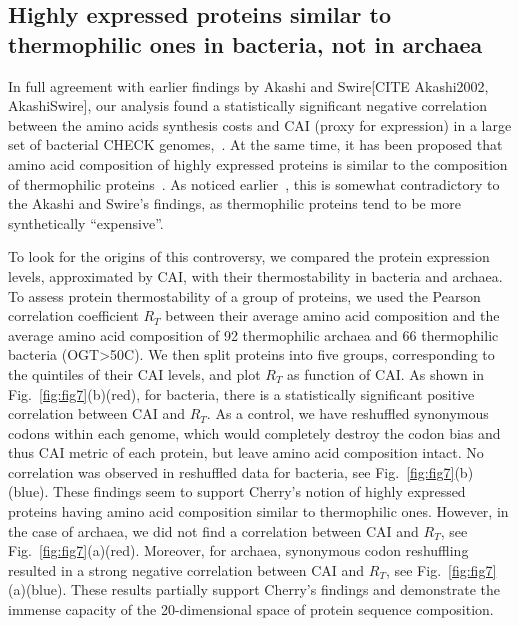 \documentclass[10pt,letterpaper]{article}
\begin{document}
\subsection*{Highly expressed proteins similar to thermophilic ones in bacteria, not in archaea}

In full agreement with earlier findings by Akashi and Swire[CITE Akashi2002, AkashiSwire], our analysis found a statistically significant negative correlation between the amino acids synthesis costs and CAI (proxy for expression) in a large set of bacterial CHECK genomes,~. At the same time, it has been proposed that amino acid composition of highly expressed proteins is similar to the composition of thermophilic proteins~\cite{Cherry2010Highly}. As noticed earlier~\cite{Serohijos2012Protein}, this is somewhat contradictory to the Akashi and Swire's findings, as thermophilic proteins tend to be more synthetically ``expensive''.

To look for the origins of this controversy, we compared the protein expression levels, approximated by CAI, with their thermostability in bacteria and archaea. To assess protein thermostability of a group of proteins, we used the Pearson correlation coefficient $R_T$ between their average amino acid composition and the average amino acid composition of 92 thermophilic archaea and 66 thermophilic bacteria (OGT>50\textdegree C).  We then split proteins into five groups, corresponding to the quintiles of their CAI levels, and plot $R_T$ as function of CAI. As shown in Fig.~\ref{fig:fig7}(b)(red), for bacteria, there is a statistically significant positive correlation between CAI and $R_T$. As a control, we have reshuffled synonymous codons within each genome, which would completely destroy the codon bias and thus CAI metric of each protein, but leave amino acid composition intact. No correlation was observed in reshuffled data for bacteria, see Fig.~\ref{fig:fig7}(b)(blue). These findings seem to support Cherry's notion of highly expressed proteins having amino acid composition similar to thermophilic ones. However, in the case of archaea, we did not find a correlation between CAI and $R_T$, see Fig.~\ref{fig:fig7}(a)(red). Moreover, for archaea, synonymous codon reshuffling resulted in a strong negative correlation between CAI and $R_T$, see Fig.~\ref{fig:fig7}(a)(blue). These results partially support Cherry's findings and demonstrate the immense capacity of the 20-dimensional space of protein sequence composition. 
\end{document}
